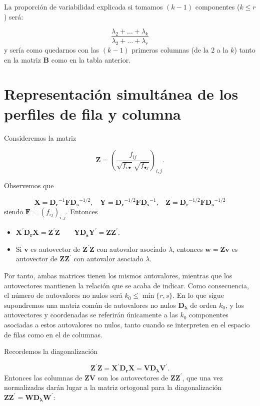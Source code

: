 \documentclass[
  a4paper,
  oneside]{scrbook}
\theoremstyle{definition}
\theoremstyle{definition}
\theoremstyle{definition}
\theoremstyle{definition}
\theoremstyle{remark}
\begin{document}
La proporción de variabilidad explicada si tomamos \((k-1)\) componentes
(\(k\leq r\)) será:

\[\frac{\lambda_2+\ldots+\lambda_k}{\lambda_2+\ldots+\lambda_{r}}\] y
sería como quedarnos con las \((k-1)\) primeras columnas (de la \(2\) a la
\(k\)) tanto en la matriz \(\bm{B}\) como en la tabla anterior.

\section{Representación simultánea de los perfiles de fila y columna}\label{representacion-simultanea-de-los-perfiles-de-fila-y-columna}

Consideremos la matriz

\[\bm{Z}=\left( \frac{f_{ij}}{\sqrt{f_{i\bullet}}\sqrt{f_{\bullet j}}} \right)_{i,j}.\]

Observemos que

\[\bm{X}=\bm{D_r}^{-1}\bm{F} \bm{D_s}^{-1/2},\ \ \ \ \bm{Y}=\bm{D_r}^{-1/2} \bm{F} \bm{D_s}^{-1},\ \ \ \ \bm{Z}=\bm{D_r}^{-1/2} \bm{F}\bm{D_s}^{-1/2}\]
siendo \(\bm{F}=\left(f_{ij}\right)_{i,j}\). Entonces

\begin{itemize}
\item
  \(\bm{X}^{\prime} \bm{D_r} \bm{X}=\bm{Z}^{\prime} \bm{Z}\qquad \bm{Y \bm{D_s} \bm{Y}^{\prime}}=\bm{Z}\bm{Z}^{\prime}.\)
\item
  Si \(\bm{v}\) es autovector de \(\bm{Z}^{\prime} \bm{Z}\) con autovalor
  asociado \(\lambda\), entonces \(\bm{w}=\bm{Z}\bm{v}\) es autovector de
  \(\bm{Z}\bm{Z}^{\prime}\) con autovalor asociado \(\lambda\).
\end{itemize}

Por tanto, ambas matrices tienen los mismos autovalores, mientras que
los autovectores mantienen la relación que se acaba de indicar. Como
consecuencia, el número de autovalores no nulos será
\(k_0\leq \min\{r,s\}\). En lo que sigue supondremos una matriz común de
autovalores no nulos \(\bm{D_{\lambda}}\) de orden \(k_0\), y los
autovectores y coordenadas se referirán únicamente a las \(k_0\)
componentes asociadas a estos autovalores no nulos, tanto cuando se
interpreten en el espacio de filas como en el de columnas.

Recordemos la diagonalización

\[\bm{Z}^{\prime} \bm{Z}= \bm{X}^{\prime} \bm{D_r} \bm{X}= \bm{V}\bm{D_{\lambda}}\bm{V}^{\prime}.\]
Entonces las columnas de \(\bm{ZV}\) son los autovectores de
\(\bm{Z}\bm{Z}^{\prime}\), que una vez normalizadas darán lugar a la
matriz ortogonal para la diagonalización
\(\bm{Z}\bm{Z}^{\prime}= \bm{W}\bm{D_{\lambda}} \bm{W}^{\prime}\):
\end{document}
